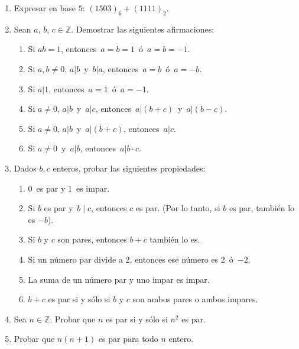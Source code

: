 \documentclass[a4paper,12pt,twoside,spanish,reqno]{amsbook}
\numberwithin{equation}{section}
\begin{document}
\begin{enumerate}
\item Expresar en  base $5$:  $(1503)_6 + (1111)_2$.  

\item Sean $a$, $b$, $c \in {\mathbb Z}$. Demostrar las siguientes afirmaciones:
  \begin{enumerate}
  \item Si $ab=1$, entonces \,$a=b=1$\, ó \,$a=b=-1$.
  \item Si $a,b \neq 0$,  $a| b$\, y \,$b | a$, entonces \,$a=b$\, ó \,$a=-b$.
  \item Si $a | 1$, entonces \,$a=1$\, ó \,$a=-1$.
  \item Si $a \neq 0$, $a | b$\, y \,$a | c$, entonces \,$a | (b+c)$\, y \,$a | (b-c)$.
  \item Si $a \neq 0$, $a | b$\, y \,$a | (b+c)$, entonces \,$a | c$.
  \item Si $a \neq 0$\, y \,$a | b$, entonces \,$a| b\cdot c$.
  \end{enumerate}


\item Dados $b,c$ enteros, probar las siguientes propiedades:
  \begin{enumerate}
  \item  $0$\, es par y $1$\, es impar.
  \item  Si $b$ es par y \,$b \mid c$, entonces $c$ es par.  (Por lo tanto, si $b$ es par, también lo es $-b$).
  \item  Si $b$ y $c$ son pares, entonces $b+c$ también lo es. %
  \item  Si un número par divide a 2, entonces ese número es 2\, ó \,$-2$.
  \item  La suma de un número par y uno impar es impar.
  \item $b + c$ es par si y  sólo si $b$ y $c$ son ambos pares o ambos impares.
\end{enumerate}


\item Sea $n\in \mathbb Z$. Probar que $n$ es par si y sólo si $n^2$ es par.


\item Probar que $n(n+1)$ es par para todo $n$ entero.



\end{enumerate}
\end{document}
